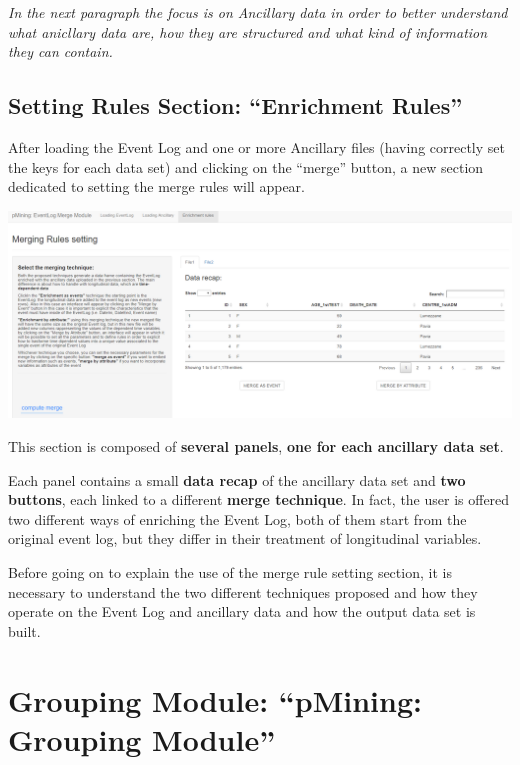 \documentclass[
]{book}
\begin{document}
\emph{In the next paragraph the focus is on Ancillary data in order to better understand what anicllary data are, how they are structured and what kind of information they can contain.}

\hypertarget{setting-rules-section-enrichment-rules}{%
\section{Setting Rules Section: ``Enrichment Rules''}\label{setting-rules-section-enrichment-rules}}

After loading the Event Log and one or more Ancillary files (having correctly set the keys for each data set) and clicking on the ``merge'' button, a new section dedicated to setting the merge rules will appear.

\includegraphics[width=1\textwidth,height=\textheight]{images/rules_section.png}

This section is composed of \textbf{several panels}, \textbf{one for each ancillary data set}.

Each panel contains a small \textbf{data recap} of the ancillary data set and \textbf{two buttons}, each linked to a different \textbf{merge technique}. In fact, the user is offered two different ways of enriching the Event Log, both of them start from the original event log, but they differ in their treatment of longitudinal variables.

Before going on to explain the use of the merge rule setting section, it is necessary to understand the two different techniques proposed and how they operate on the Event Log and ancillary data and how the output data set is built.

\hypertarget{grouping-module-pmining-grouping-module}{%
\chapter{Grouping Module: ``pMining: Grouping Module''}\label{grouping-module-pmining-grouping-module}}
\end{document}
